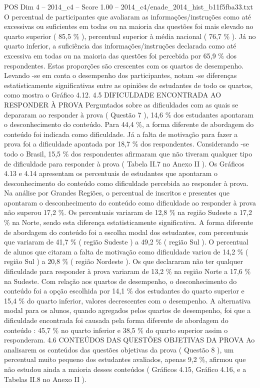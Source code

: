 \begin{textsample}{POS Dim 4 – 2014\_c4 – Score 1.00 – 2014\_c4/enade\_2014\_hist\_b11f5fba33.txt}
O percentual de participantes que avaliaram as informações/instruções como até excessivas ou suficientes em todas ou na maioria das questões foi mais elevado no quarto superior ( 85,5 \% ), percentual superior à média nacional ( 76,7 \% ).
Já no quarto inferior, a suficiência das informações/instruções declarada como até excessiva em todas ou na maioria das questões foi percebida por 65,9 \% dos respondentes.
Estas proporções são crescentes com os quartos de desempenho.
Levando -se em conta o desempenho dos participantes, notam -se diferenças estatisticamente significativas entre as opiniões de estudantes de todo os quartos, como mostra o Gráfico 4.12. 4.5 DIFICULDADE ENCONTRADA AO RESPONDER À PROVA Perguntados sobre as dificuldades com as quais se depararam ao responder à prova ( Questão 7 ), 14,6 \% dos estudantes apontaram o desconhecimento do conteúdo.
Para 44,4 \%, a forma diferente de abordagem do conteúdo foi indicada como dificuldade.
Já a falta de motivação para fazer a prova foi a dificuldade apontada por 18,7 \% dos respondentes.
Considerando -se todo o Brasil, 15,5 \% dos respondentes afirmaram que não tiveram qualquer tipo de dificuldade para responder à prova ( Tabela II.7 no Anexo II ).
Os Gráficos 4.13 e 4.14 apresentam os percentuais de estudantes que apontaram o desconhecimento do conteúdo como dificuldade percebida ao responder à prova.
Na análise por Grandes Regiões, o percentual de inscritos e presentes que apontaram o desconhecimento do conteúdo como dificuldade ao responder à prova não superou 17,2 \%.
Os percentuais variaram de 12,8 \% na região Sudeste a 17,2 \% na Norte, sendo esta diferença estatisticamente significativa.
A forma diferente de abordagem do conteúdo foi a escolha modal dos estudantes, com percentuais que variaram de 41,7 \% ( região Sudeste ) a 49,2 \% ( região Sul ).
O percentual de alunos que citaram a falta de motivação como dificuldade variou de 14,2 \% ( região Sul ) a 20,8 \% ( região Nordeste ).
Os que declararam não ter qualquer dificuldade para responder à prova variaram de 13,2 \% na região Norte a 17,6 \% na Sudeste.
Com relação aos quartos de desempenho, o desconhecimento do conteúdo foi a opção escolhida por 14,1 \% dos estudantes do quarto superior e 15,4 \% do quarto inferior, valores decrescentes com o desempenho.
A alternativa modal para os alunos, quando agregados pelos quartos de desempenho, foi que a dificuldade encontrada foi causada pela forma diferente de abordagem do conteúdo : 45,7 \% no quarto inferior e 38,5 \% do quarto superior assim o responderam. 4.6 CONTEÚDOS DAS QUESTÕES OBJETIVAS DA PROVA Ao analisarem os conteúdos das questões objetivas da prova ( Questão 8 ), um percentual muito pequeno dos estudantes avaliados, apenas 9,2 \%, afirmou que não estudou ainda a maioria desses conteúdos ( Gráficos 4.15, Gráfico 4.16, e a Tabelas II.8 no Anexo II ).

\end{textsample}
